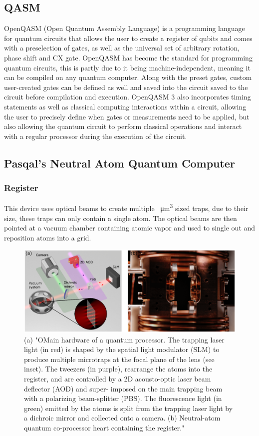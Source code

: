 \subsection{QASM}
\label{sec:Qasm}
OpenQASM (Open Quantum Assembly Language) is a programming language for quantum circuits that allows the user to create a register of qubits and comes with a preselection of gates, as well as the universal set of arbitrary rotation,
 phase shift and CX gate. OpenQASM has become the standard for programming quantum circuits, this is partly due to it being machine-independent, meaning it can be compiled on any
  quantum computer. 
  Along with the preset gates, custom user-created gates can be defined as well and saved into the circuit saved to the circuit before compilation and execution. 
  OpenQASM 3 also incorporates timing statements as well as classical computing interactions within a circuit, allowing the user to precisely define when gates or 
  measurements need to be applied, but also allowing the quantum circuit to perform classical operations and interact with a regular processor during the execution of the circuit.


\newpage
\subsection{Pasqal's Neutral Atom Quantum Computer}
\label{sec:NAQC}
\subsubsection{Register}
This device uses optical beams to create multiple \SI{}{\micro\meter\cubed} sized traps,
due to their size, these traps can only contain a single atom. The optical beams are then pointed at a vacuum chamber containing atomic vapor and used to single out and reposition atoms into a grid.
\begin{figure}[h]
  \centering
  \includegraphics[width=170mm]{./Images/registerHardware.png}
  \caption{(a) "OMain hardware of a quantum processor. The trapping laser light (in red) is shaped by the spatial light modulator (SLM) to produce multiple microtraps
  at the focal plane of the lens (see inset). The tweezers (in purple), rearrange
  the atoms into the register, and are controlled by a 2D acousto-optic laser beam deflector (AOD) and super-
  imposed on the main trapping beam with a polarizing beam-splitter (PBS). The fluorescence light (in
  green) emitted by the atoms is split from the trapping laser light by a dichroic mirror and collected
  onto a camera. (b) Neutral-atom quantum co-processor heart containing the register."} 
  \label{fig:hardwareregister}
\end{figure}
